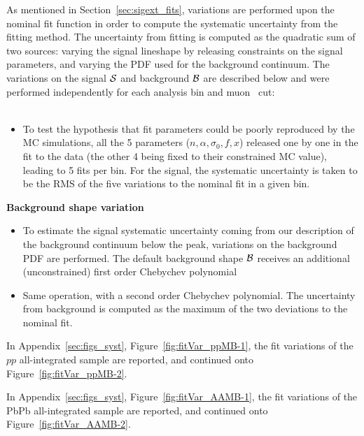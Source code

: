 As mentioned in Section~\ref{sec:sigext_fits},
variations are performed upon the nominal fit function in order to compute the systematic
uncertainty from the fitting method. The uncertainty from fitting is computed
as the quadratic sum of two sources: varying the signal lineshape by releasing
constraints on the signal parameters, and varying the PDF used for the
background continuum. The variations on the signal ${\cal S}$ and
background ${\cal B}$ are described below and were performed
independently for each analysis bin and muon \pt\ cut:\\ ~\\
\begin{itemize}
\item {To test the hypothesis that fit parameters could be poorly
    reproduced by the MC simulations, all the 5 parameters ($n, \alpha, \sigma_{0}, f, x$)
  released one by one in the fit to the data (the other 4 being fixed
  to their constrained MC value), leading to 5 fits per bin. For the signal, the
  systematic uncertainty is taken to be the RMS of the five variations to the nominal
  fit in a given bin.}
\end{itemize}
{\bf Background shape variation}
\begin{itemize}
\item{To estimate the signal systematic uncertainty coming
    from our description of the background continuum below the peak, variations
    on the background PDF are performed. The default background shape ${\cal B}$ receives an additional (unconstrained) first order Chebychev polynomial}
\item{Same operation, with a second order Chebychev polynomial. The uncertainty
  from background is computed as the maximum of the two
  deviations to the nominal fit.}
\end{itemize}

In Appendix~\ref{sec:figs_syst}, Figure~\ref{fig:fitVar_ppMB-1}, the fit variations of the $pp$
all-integrated sample are reported, and continued onto
Figure~\ref{fig:fitVar_ppMB-2}. 


In Appendix~\ref{sec:figs_syst}, Figure~\ref{fig:fitVar_AAMB-1}, the fit variations of the PbPb
all-integrated sample are reported, and continued onto Figure~\ref{fig:fitVar_AAMB-2}.


